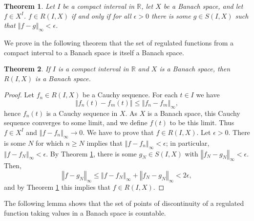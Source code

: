 \documentclass{article}
\newcommand{\norm}[1]{\left\Vert #1 \right\Vert}
\newtheorem{theorem}{Theorem}
\theoremstyle{definition}
\begin{document}
\begin{theorem}
Let $I$ be a compact interval in $\mathbb{R}$, let $X$ be a Banach space, and let $f \in X^I$. $f \in R(I,X)$ 
if and only if for all $\epsilon>0$ there is some $g \in S(I,X)$ such that $\norm{f-g}_\infty<\epsilon$.
\label{stepdense}
\end{theorem}



We prove  in the following theorem that the set of regulated functions from a compact interval to a Banach space is itself a Banach space.

\begin{theorem}
If $I$ is a compact interval in $\mathbb{R}$ and $X$ is a Banach space, then $R(I,X)$ is a Banach space.
\end{theorem}
\begin{proof}
Let $f_n \in R(I,X)$ be a Cauchy sequence. For each $t \in I$ we have
\[
\norm{f_n(t)-f_m(t)} \leq \norm{f_n-f_m}_\infty,
\] 
hence $f_n(t)$ is a Cauchy sequence in $X$. As $X$ is a Banach space, this Cauchy sequence converges to some limit, and we define
$f(t)$ to be this limit. Thus $f \in X^I$ and $\norm{f-f_n}_\infty \to 0$. We have to prove that $f \in R(I,X)$.
Let $\epsilon>0$. There is some $N$ for which $n \geq N$ implies that $\norm{f-f_n}_\infty < \epsilon$; in particular,
$\norm{f-f_N}_\infty<\epsilon$.
By Theorem \ref{stepdense}, there is some $g_N \in S(I,X)$ with $\norm{f_N-g_N}_\infty<\epsilon$. Then,
\[
\norm{f-g_N}_\infty \leq \norm{f-f_N}_\infty+\norm{f_N-g_N}_\infty < 2\epsilon,
\]
and by Theorem \ref{stepdense} this implies that $f \in R(I,X)$.
\end{proof}


The following lemma shows that the set of points of discontinuity of a regulated function taking values in a Banach space is countable.
\end{document}
